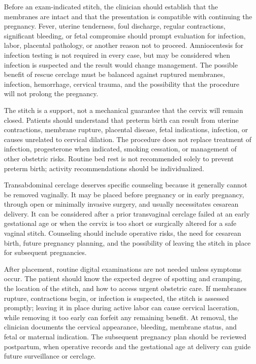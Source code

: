 Before an exam-indicated stitch, the clinician should establish that the membranes are intact and that the presentation is compatible with continuing the pregnancy. Fever, uterine tenderness, foul discharge, regular contractions, significant bleeding, or fetal compromise should prompt evaluation for infection, labor, placental pathology, or another reason not to proceed. Amniocentesis for infection testing is not required in every case, but may be considered when infection is suspected and the result would change management. The possible benefit of rescue cerclage must be balanced against ruptured membranes, infection, hemorrhage, cervical trauma, and the possibility that the procedure will not prolong the pregnancy.

The stitch is a support, not a mechanical guarantee that the cervix will remain closed. Patients should understand that preterm birth can result from uterine contractions, membrane rupture, placental disease, fetal indications, infection, or causes unrelated to cervical dilation. The procedure does not replace treatment of infection, progesterone when indicated, smoking cessation, or management of other obstetric risks. Routine bed rest is not recommended solely to prevent preterm birth; activity recommendations should be individualized.

Transabdominal cerclage deserves specific counseling because it generally cannot be removed vaginally. It may be placed before pregnancy or in early pregnancy, through open or minimally invasive surgery, and usually necessitates cesarean delivery. It can be considered after a prior transvaginal cerclage failed at an early gestational age or when the cervix is too short or surgically altered for a safe vaginal stitch. Counseling should include operative risks, the need for cesarean birth, future pregnancy planning, and the possibility of leaving the stitch in place for subsequent pregnancies.

After placement, routine digital examinations are not needed unless symptoms occur. The patient should know the expected degree of spotting and cramping, the location of the stitch, and how to access urgent obstetric care. If membranes rupture, contractions begin, or infection is suspected, the stitch is assessed promptly; leaving it in place during active labor can cause cervical laceration, while removing it too early can forfeit any remaining benefit. At removal, the clinician documents the cervical appearance, bleeding, membrane status, and fetal or maternal indication. The subsequent pregnancy plan should be reviewed postpartum, when operative records and the gestational age at delivery can guide future surveillance or cerclage.

